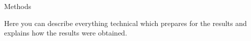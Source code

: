 \begin{section}{Methods}\label{sec:Methods}

  Here you can describe everything technical which prepares for the
  results and explains how the results were obtained.

\end{section}
